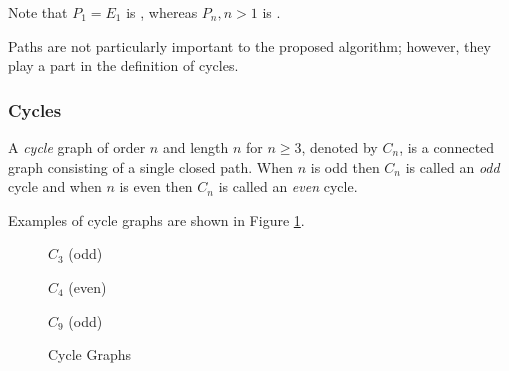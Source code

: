 Note that \(P_1=E_1\) is , whereas \(P_n,n>1\) is .

Paths are not particularly important to the proposed algorithm; however, they play a part in the definition of
cycles.

\subsubsection{Cycles}

A \emph{cycle} graph of order \(n\) and length \(n\) for \(n\ge3\), denoted by \(C_n\), is a connected graph
consisting of a single closed path.  When \(n\) is odd then \(C_n\) is called an \emph{odd} cycle and when \(n\) is
even then \(C_n\) is called an \emph{even} cycle.

Examples of cycle graphs are shown in Figure \ref{fig:cycle}.

\begin{figure}[h]
  \label{fig:cycle}
  \begin{minipage}{2in}
    \begin{center}

      \bigskip

      \(C_3\) (odd)
    \end{center}
  \end{minipage}
  \begin{minipage}{2in}
    \begin{center}

      \bigskip

      \(C_4\) (even)
    \end{center}
  \end{minipage}
  \begin{minipage}{2in}
    \begin{center}

      \bigskip

      \(C_9\) (odd)
    \end{center}
  \end{minipage}
  \caption{Cycle Graphs}
\end{figure}

